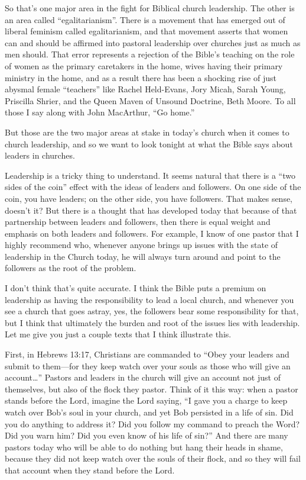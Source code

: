 \documentclass[letterpaper, 12pt]{article}
\begin{document}
    So that's one major area in the fight for Biblical church
    leadership. The other is an area called ``egalitarianism''. There is
    a movement that has emerged out of liberal feminism called
    egalitarianism, and that movement asserts that women can and should
    be affirmed into pastoral leadership over churches just as much as
    men should. That error represents a rejection of the Bible's
    teaching on the role of women as the primary caretakers in the home,
    wives having their primary ministry in the home, and as a result
    there has been a shocking rise of just abysmal female ``teachers''
    like Rachel Held-Evans, Jory Micah, Sarah Young, Priscilla Shrier,
    and the Queen Maven of Unsound Doctrine, Beth Moore. To all those I
    say along with John MacArthur, ``Go home.''

    But those are the two major areas at stake in today's church when it
    comes to church leadership, and so we want to look tonight at what
    the Bible says about leaders in churches.

    Leadership is a tricky thing to understand. It seems natural that
    there is a ``two sides of the coin'' effect with the ideas of
    leaders and followers. On one side of the coin, you have leaders; on
    the other side, you have followers. That makes sense, doesn't it?
    But there is a thought that has developed today that because of that
    partnership between leaders and followers, then there is equal
    weight and emphasis on both leaders and followers. For example, I
    know of one pastor that I highly recommend who, whenever anyone
    brings up issues with the state of leadership in the Church today,
    he will always turn around and point to the followers as the root of
    the problem.

    I don't think that's quite accurate. I think the Bible puts a
    premium on leadership as having the responsibility to lead a local
    church, and whenever you see a church that goes astray, yes, the
    followers bear some responsibility for that, but I think that
    ultimately the burden and root of the issues lies with leadership.
    Let me give you just a couple texts that I think illustrate this.
    
    First, in Hebrews 13:17, Christians are commanded to ``Obey your
    leaders and submit to them---for they keep watch over your souls as
    those who will give an account\ldots'' Pastors and leaders in the
    church will give an account not just of themselves, but also of the
    flock they pastor. Think of it this way: when a pastor stands before
    the Lord, imagine the Lord saying, ``I gave you a charge to keep
    watch over Bob's soul in your church, and yet Bob persisted in a
    life of sin. Did you do anything to address it? Did you follow my
    command to preach the Word? Did you warn him? Did you even know of
    his life of sin?'' And there are many pastors today who will be able
    to do nothing but hang their heads in shame, because they did not
    keep watch over the souls of their flock, and so they will fail that
    account when they stand before the Lord.
\end{document}

